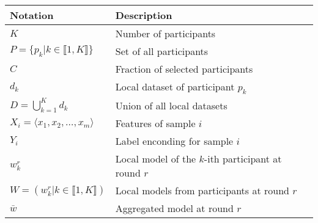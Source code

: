 
\begin{tabular}{ll}
  \toprule %
  \textbf{Notation}                                                   & \textbf{Description} \\
  \midrule %
  $K$                                                                 & Number of participants \\
  $P = \lbrace p_k | k \in \llbracket 1,K \rrbracket \rbrace$         & Set of all participants \\
  $C$                                                                 & Fraction of selected participants \\
  $d_k$                                                               & Local dataset of participant $p_k$ \\
  $D = \bigcup_{k=1}^K d_k$                                           & Union of all local datasets \\
  $X_i = \langle x_1, x_2, \dots, x_m \rangle$                        & Features of sample $i$ \\
  $Y_i$                                                               & Label enconding for sample $i$ \\
  $w_k^r$                                                             & Local model of the $k$-ith participant at round $r$ \\
  $W = (w_k^r | k \in \llbracket 1,K \rrbracket)$                     & Local models from participants at round $r$ \\
  $\bar{w}$                                                           & Aggregated model at round $r$ \\
  \bottomrule %
\end{tabular}